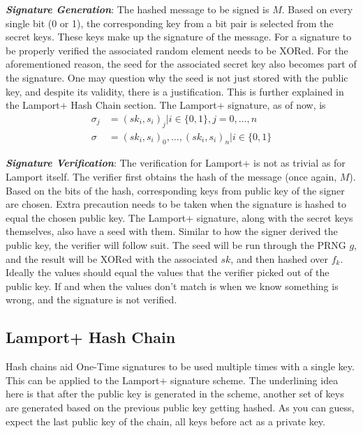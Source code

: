 \documentclass[]{scrartcl}
\makeatletter
\newcommand{\mathcenter}{\@fleqnfalse}
\makeatother
\begin{document}
\textbf{\textit{Signature Generation}}: The hashed message to be signed is $M$. Based on every single bit (0 or 1), the corresponding key from a bit pair is selected from the secret keys. These keys make up the signature of the message. For a signature to be properly verified the associated random element needs to be XORed. For the aforementioned reason, the seed for the associated secret key also becomes part of the signature. One may question why the seed is not just stored with the public key, and despite its validity, there is a justification. This is further explained in the Lamport+ Hash Chain section. The Lamport+ signature, as of now, is  
\mathcenter
\begin{equation}
\begin{split}
\sigma_j & = (sk_i, s_i)_j | i \in \{0, 1\}, j = 0,...,n \\
\sigma & = (sk_i, s_i)_0,...,(sk_i, s_i)_n | i \in \{0, 1\}
\end{split}
\end{equation}

\textbf{\textit{Signature Verification}}: The verification for Lamport+ is not as trivial as for Lamport itself. The verifier first obtains the hash of the message (once again, $M$). Based on the bits of the hash, corresponding keys from public key of the signer are chosen. Extra precaution needs to be taken when the signature is hashed to equal the chosen public key. The Lamport+ signature, along with the secret keys themselves, also have a seed with them. Similar to how the signer derived the public key, the verifier will follow suit. The seed will be run through the PRNG $g$, and the result will be XORed with the associated $sk$, and then hashed over $f_k$. Ideally the values should equal the values that the verifier picked out of the public key. If and when the values don't match is when we know something is wrong, and the signature is not verified.

\subsection*{Lamport+ Hash Chain}
Hash chains aid One-Time signatures to be used multiple times with a single key. This can be applied to the Lamport+ signature scheme. The underlining idea here is that after the public key is generated in the scheme, another set of keys are generated based on the previous public key getting hashed. As you can guess, expect the last public key of the chain, all keys before act as a private key.
\end{document}
